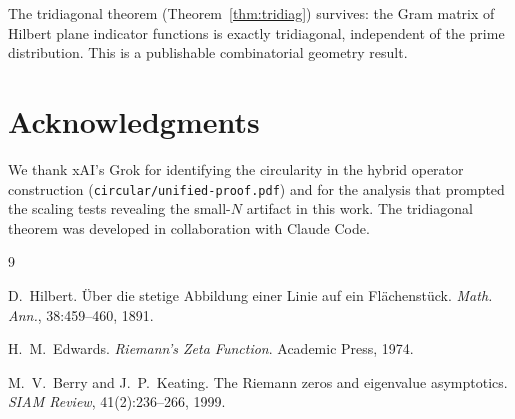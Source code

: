 \documentclass[11pt,a4paper]{article}
\theoremstyle{definition}
\begin{document}
The tridiagonal theorem (Theorem~\ref{thm:tridiag}) survives: the Gram
matrix of Hilbert plane indicator functions is exactly tridiagonal,
independent of the prime distribution. This is a publishable
combinatorial geometry result.

\section*{Acknowledgments}

We thank xAI's Grok for identifying the circularity in the hybrid
operator construction (\texttt{circular/unified-proof.pdf}) and for
the analysis that prompted the scaling tests revealing the small-$N$
artifact in this work. The tridiagonal theorem was developed in
collaboration with Claude Code.

\begin{thebibliography}{9}

D.~Hilbert.
\"{U}ber die stetige Abbildung einer Linie auf ein Fl\"{a}chenst\"{u}ck.
\emph{Math. Ann.}, 38:459--460, 1891.

H.~M.~Edwards.
\emph{Riemann's Zeta Function}.
Academic Press, 1974.

M.~V.~Berry and J.~P.~Keating.
The Riemann zeros and eigenvalue asymptotics.
\emph{SIAM Review}, 41(2):236--266, 1999.

\end{thebibliography}
\end{document}
